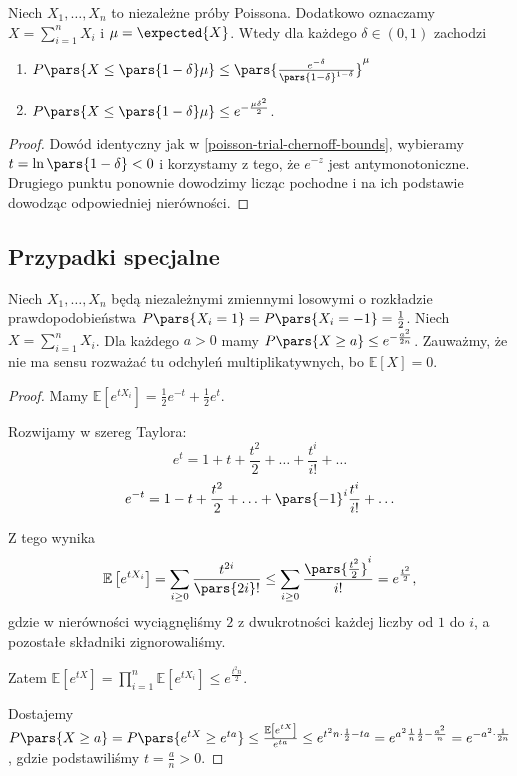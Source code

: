 \begin{theorem}
	\label{poisson-trial-chernoff-lowerbounds}
	Niech \(X_1, \dots, X_n\) to niezależne próby Poissona. Dodatkowo oznaczamy \(X = \sum_{i=1}^n{X_i}\) i \(\mu = \expected{X}\). Wtedy dla każdego \(\delta \in (0,1)\) zachodzi
	\begin{enumerate}
		\item \( P \pars{ X \le \pars{ 1-\delta } \mu } \le \pars{ \frac{e^{-\delta}}{ \pars{ 1-\delta } ^{1-\delta}} } ^{\mu}\)
		\item \(P \pars{ X \le \pars{ 1-\delta } \mu } \le e^{-\frac{\mu\delta^2}{2}}\).
	\end{enumerate}
\end{theorem}
\begin{proof}
	Dowód identyczny jak w \ref{poisson-trial-chernoff-bounds}, wybieramy \(t = \ln \pars{ 1-\delta } < 0\) i korzystamy z tego, że \(e^{-z}\) jest antymonotoniczne. Drugiego punktu ponownie dowodzimy licząc pochodne i na ich podstawie dowodząc odpowiedniej nierówności.
\end{proof}

\subsection{Przypadki specjalne}
\begin{theorem}
	Niech \(X_1,\ldots,X_n\) będą niezależnymi zmiennymi losowymi o rozkładzie prawdopodobieństwa \(P \pars{ X_i = 1 } = P \pars{ X_i = -1 } = \frac{1}{2}\). Niech \(X = \sum_{i=1}^{n} X_i\). Dla każdego \(a>0\) mamy \(P \pars{ X \ge a } \le e^{-\frac{a^2}{2n}}\). Zauważmy, że nie ma sensu rozważać tu odchyleń multiplikatywnych, bo \(\mathbb{E}\left[ X \right] = 0\).
\end{theorem}
\begin{proof}
	Mamy \(\mathbb{E}\left[ e^{tX_{i}} \right] = \frac{1}{2}e^{-t} + \frac{1}{2}e^{t}\).

	Rozwijamy w szereg Taylora:
	\[e^{t} = 1 + t + \frac{t^2}{2} + \ldots + \frac{t ^{i}}{i!} + \ldots\]
	\[e^{-t} = 1 -t + \frac{t^2}{2} + \ldots + \pars{ -1 } ^{i} \frac{t ^{i}}{i!} + \ldots\]

	Z tego wynika \[\mathbb{E}\left[ e^{tX_i} \right] = \sum_{i\ge 0}^{} \frac{t ^{2i}}{ \pars{ 2i } !} \le \sum_{i\ge 0}^{} \frac{ \pars{ \frac{t^2}{2} } ^{i}}{i!} = e^{\frac{t^2}{2}},\] gdzie w nierówności wyciągnęliśmy \(2\) z dwukrotności każdej liczby od \(1\) do \(i\), a pozostałe składniki zignorowaliśmy.

	Zatem \(\mathbb{E}\left[ e^{tX} \right] = \prod_{i=1}^{n} \mathbb{E}\left[e^{tX_i}\right] \le e^{\frac{t^2n}{2}} \).

	Dostajemy \(P \pars{ X\ge a } = P \pars{ e^{tX}\ge e^{ta} } \le \frac{\mathbb{E}\left[ e^{tX} \right] }{e^{ta}} \le e^{t^2n\cdot \frac{1}{2}-ta} = e^{a^2 \frac{1}{n} \frac{1}{2} - \frac{a^2}{n}} = e^{-a^2\cdot \frac{1}{2n}}\), gdzie podstawiliśmy \(t = \frac{a}{n} > 0\).
\end{proof}

